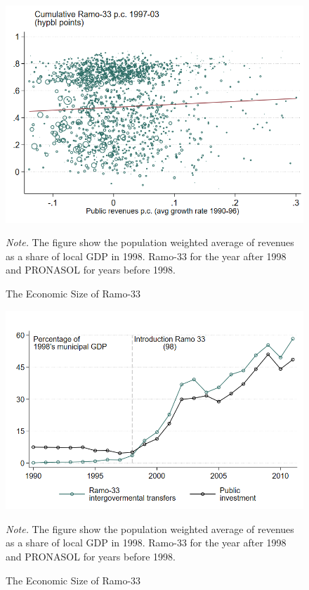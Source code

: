 \documentclass[dv_diss_main.tex]{subfiles}
\begin{document}
\begin{figure}[h]
	\begin{center}
			\includegraphics[width=0.8\linewidth]{figures/2_Unexpected.png}
			\caption{The Economic Size of Ramo-33}\label{fig:unexpected}
	\end{center}
	\vspace{0.5em}
	\begin{figurenotes}
    \footnotesize	
	\textit{Note. }The figure show the population weighted average of revenues as a share of local GDP in 1998. Ramo-33 for the year after 1998 and PRONASOL for years before 1998.
    \end{figurenotes}
\end{figure}

\newpage

\begin{figure}[h]
	\begin{center}
			\includegraphics[width=0.8\linewidth]{figures/2_Panel_a_fig_sizable.png}
			\caption{The Economic Size of Ramo-33}\label{fig:iceconsizer33}
	\end{center}
	\vspace{0.5em}
	\begin{figurenotes}
    \footnotesize	
	\textit{Note. }The figure show the population weighted average of revenues as a share of local GDP in 1998. Ramo-33 for the year after 1998 and PRONASOL for years before 1998.
	
    \end{figurenotes}
\end{figure}
\end{document}
